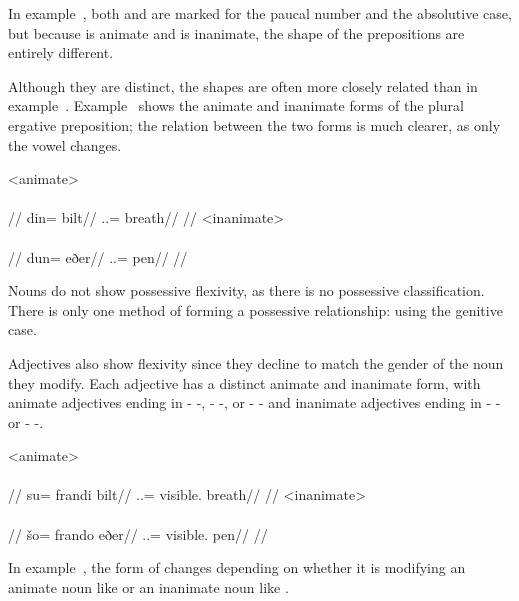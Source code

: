 In example~, both   and   are marked for the paucal number and the absolutive case, but because   is animate and   is inanimate, the shape of the prepositions are entirely different.

Although they are distinct, the shapes are often more closely related than in example~. Example~ shows the animate and inanimate forms of the plural ergative preposition; the relation between the two forms is much clearer, as only the vowel changes.

	\a<animate>\begingl
		\glpreamble{}\\
		\\
		//
		\gla din= bilt//
		\glb \An.\Pl.\Erg= breath//
		\glft{}//
	\endgl
	\a<inanimate>\begingl
		\glpreamble{}\\
		\\
		//
		\gla dun= eðer//
		\glb \In.\Pl.\Erg= pen//
		\glft{}//
	\endgl
\xe

Nouns do not show possessive flexivity, as there is no possessive classification\autocite{wals-59}. There is only one method of forming a possessive relationship: using the genitive case.

Adjectives also show flexivity since they decline to match the gender of the noun they modify. Each adjective has a distinct animate and inanimate form, with animate adjectives ending in - -, - -, or - - and inanimate adjectives ending in - - or - -.

	\a<animate>\begingl
		\glpreamble{}\\
		\\
		//
		\gla su= frandi bilt//
		\glb \An.\Sg.\Gen= visible.\An{} breath//
		\glft{}//
	\endgl
	\a<inanimate>\begingl
		\glpreamble{}\\
		\\
		//
		\gla šo= frando eðer//
		\glb \In.\Sg.\Gen= visible.\In{} pen//
		\glft{}//
	\endgl
\xe

In example~, the form of   changes depending on whether it is modifying an animate noun like   or an inanimate noun like  .

